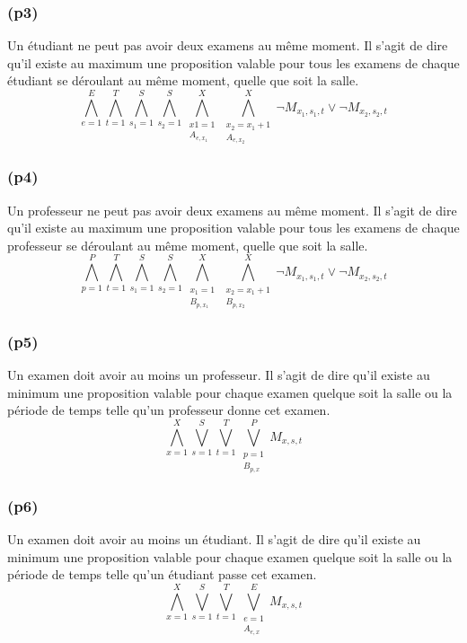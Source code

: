 \documentclass[a4paper,11pt]{article}
\begin{document}
\subsubsection{(p3)}
Un étudiant ne peut pas avoir deux examens au même moment.
Il s'agit de dire qu'il existe au maximum une proposition valable pour tous les examens de chaque étudiant se déroulant au même moment, quelle que soit la salle.
\begin{displaymath}
\bigwedge\limits_{e=1}^{E}\bigwedge\limits_{t=1}^{T}\bigwedge\limits_{s_{1}=1}^{S}\bigwedge\limits_{s_{2}=1}^{S}\bigwedge\limits_{\substack{x1=1 \\ A_{e,x_{1}}}}^{X}\bigwedge\limits_{\substack{x_{2}=x_{1}+1 \\ A_{e,x_{2}}}}^{X} \neg M_{x_{1}, s_{1}, t} \vee \neg M_{x_{2}, s_{2}, t}
\end{displaymath}

\subsubsection{(p4)}
Un professeur ne peut pas avoir deux examens au même moment.
Il s'agit de dire qu'il existe au maximum une proposition valable pour tous les examens de chaque professeur se déroulant au même moment, quelle que soit la salle.
\begin{displaymath}
\bigwedge\limits_{p=1}^{P}\bigwedge\limits_{t=1}^{T}\bigwedge\limits_{s_{1}=1}^{S}\bigwedge\limits_{s_{2}=1}^{S}\bigwedge\limits_{\substack{x_{1}=1 \\ B_{p,x_{1}}}}^{X}\bigwedge\limits_{\substack{x_{2}=x_{1}+1 \\ B_{p,x_{2}}}}^{X} \neg M_{x_{1}, s_{1}, t} \vee \neg M_{x_{2}, s_{2}, t}
\end{displaymath}

\subsubsection{(p5)}
Un examen doit avoir au moins un professeur.
Il s'agit de dire qu'il existe au minimum une proposition valable pour chaque examen quelque soit la salle ou la période de temps telle qu'un professeur donne cet examen.
\begin{displaymath}
\bigwedge\limits_{x=1}^{X}\bigvee\limits_{s=1}^{S}\bigvee\limits_{t=1}^{T}\bigvee\limits_{\substack{p=1 \\ B_{p,x}}}^{P} M_{x, s, t}
\end{displaymath}

\subsubsection{(p6)}
Un examen doit avoir au moins un étudiant.
Il s'agit de dire qu'il existe au minimum une proposition valable pour chaque examen quelque soit la salle ou la période de temps telle qu'un étudiant passe cet examen.
\begin{displaymath}
\bigwedge\limits_{x=1}^{X}\bigvee\limits_{s=1}^{S}\bigvee\limits_{t=1}^{T}\bigvee\limits_{\substack{e=1 \\ A_{e,x}}}^{E} M_{x, s, t}
\end{displaymath}
\end{document}
